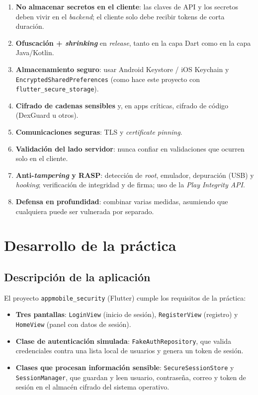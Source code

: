 \documentclass[12pt,letterpaper]{article}
\begin{document}
\begin{enumerate}[leftmargin=1.6em]
  \item \textbf{No almacenar secretos en el cliente}: las claves de API y los
        secretos deben vivir en el \emph{backend}; el cliente solo debe recibir
        tokens de corta duración.
  \item \textbf{Ofuscación + \emph{shrinking}} en \emph{release}, tanto en la capa
        Dart como en la capa Java/Kotlin.
  \item \textbf{Almacenamiento seguro}: usar Android Keystore / iOS Keychain y
        \texttt{EncryptedSharedPreferences} (como hace este proyecto con
        \texttt{flutter\_secure\_storage}).
  \item \textbf{Cifrado de cadenas sensibles} y, en apps críticas, cifrado de
        código (DexGuard u otros).
  \item \textbf{Comunicaciones seguras}: TLS y \emph{certificate pinning}.
  \item \textbf{Validación del lado servidor}: nunca confiar en validaciones que
        ocurren solo en el cliente.
  \item \textbf{Anti-\emph{tampering} y RASP}: detección de \emph{root},
        emulador, depuración (USB) y \emph{hooking}; verificación de integridad y
        de firma; uso de la \emph{Play Integrity API}.
  \item \textbf{Defensa en profundidad}: combinar varias medidas, asumiendo que
        cualquiera puede ser vulnerada por separado.
\end{enumerate}

\section{Desarrollo de la práctica}

\subsection{Descripción de la aplicación}

El proyecto \texttt{appmobile\_security} (Flutter) cumple los requisitos de la
práctica:

\begin{itemize}[leftmargin=1.4em]
  \item \textbf{Tres pantallas}: \texttt{LoginView} (inicio de sesión),
        \texttt{RegisterView} (registro) y \texttt{HomeView} (panel con datos de
        sesión).
  \item \textbf{Clase de autenticación simulada}: \texttt{FakeAuthRepository},
        que valida credenciales contra una lista local de usuarios y genera un
        token de sesión.
  \item \textbf{Clases que procesan información sensible}:
        \texttt{SecureSessionStore} y \texttt{SessionManager}, que guardan y leen
        usuario, contraseña, correo y token de sesión en el almacén cifrado del
        sistema operativo.
\end{itemize}
\end{document}
